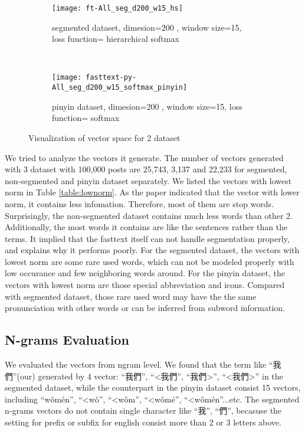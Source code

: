 \begin{figure*}[t!]
    \centering
     
    \begin{subfigure}[t]{0.5\textwidth}
        \centering
        \texttt{[image: ft-All\_seg\_d200\_w15\_hs]}
        \caption{segmented dataset, dimesion=200 , window size=15, loss function=  hierarchical softmax}
    \end{subfigure}%
    ~
    \begin{subfigure}[t]{0.5\textwidth}
        \centering
        \texttt{[image: fasttext-py-All\_seg\_d200\_w15\_softmax\_pinyin]}
        \caption{pinyin dataset,  dimesion=200 , window size=15, loss function= softmax}
    \end{subfigure}
    \caption{Visualization of vector space for 2 dataset}
    \label{tsne}
\end{figure*}


We tried to analyze the vectors it generate. The number of vectors generated with 3 dataset with 100,000 posts are 25,743, 3,137 and 22,233 for segmented, non-segmented and pinyin dataset separately. 
We listed the vectors with lowest norm in Table \ref{table:lownorm}. As the paper indicated that the vector with lower norm, it contains less infomation. 
Therefore, most of them are stop words. Surprisingly, the non-segmented dataset contains much less words than other 2. 
Additionally, the most words it contains are like the sentences rather than the terms. It implied that the fasttext itself can not handle segmentation properly, and explains why it performs poorly. 
For the segmented dataset, the vectors with lowest norm are some rare used words, which can not be modeled properly with low occurance and few neighboring words around.
For the pinyin dataset, the vectors with lowest norm are those special abbreviation and icons. Compared with segmented dataset, those rare used word may have the the same pronunciation with other words or can be inferred from subword information.


\subsection{N-grams Evaluation}

We evaluated the vectors from ngram level. We found that the term like \enquote{我們}(our) generated by 4 vector: \enquote{我們}, \enquote{\textless 我們}, \enquote{我們\textgreater}, \enquote{\textless 我們\textgreater} in the segmented dataset,
while the counterpart in the pinyin dataset consist 15 vectors, including \enquote{wǒmén}, \enquote{\textless wǒ}, \enquote{\textless wǒm}, \enquote{\textless wǒmé}, \enquote{\textless wǒmén}...etc. 
The segmented n-grams vectors do not contain single character like \enquote{我}, \enquote{們}, becasuse the setting for prefix or subfix for english consist more than 2 or 3 letters above.

